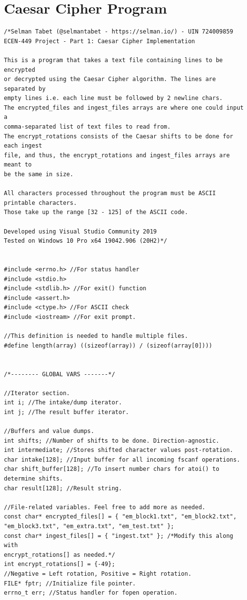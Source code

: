 \documentclass{article}
\begin{document}
\section*{Caesar Cipher Program}
\begin{verbatim}
/*Selman Tabet (@selmantabet - https://selman.io/) - UIN 724009859
ECEN-449 Project - Part 1: Caesar Cipher Implementation

This is a program that takes a text file containing lines to be encrypted
or decrypted using the Caesar Cipher algorithm. The lines are separated by 
empty lines i.e. each line must be followed by 2 newline chars.
The encrypted_files and ingest_files arrays are where one could input a 
comma-separated list of text files to read from.
The encrypt_rotations consists of the Caesar shifts to be done for each ingest
file, and thus, the encrypt_rotations and ingest_files arrays are meant to
be the same in size.

All characters processed throughout the program must be ASCII printable characters.
Those take up the range [32 - 125] of the ASCII code.

Developed using Visual Studio Community 2019
Tested on Windows 10 Pro x64 19042.906 (20H2)*/


#include <errno.h> //For status handler
#include <stdio.h>
#include <stdlib.h> //For exit() function
#include <assert.h>
#include <ctype.h> //For ASCII check
#include <iostream> //For exit prompt.

//This definition is needed to handle multiple files.
#define length(array) ((sizeof(array)) / (sizeof(array[0])))


/*-------- GLOBAL VARS -------*/

//Iterator section.
int i; //The intake/dump iterator.
int j; //The result buffer iterator.

//Buffers and value dumps.
int shifts; //Number of shifts to be done. Direction-agnostic.
int intermediate; //Stores shifted character values post-rotation.
char intake[128]; //Input buffer for all incoming fscanf operations.
char shift_buffer[128]; //To insert number chars for atoi() to determine shifts.
char result[128]; //Result string.

//File-related variables. Feel free to add more as needed.
const char* encrypted_files[] = { "em_block1.txt", "em_block2.txt",
"em_block3.txt", "em_extra.txt", "em_test.txt" };
const char* ingest_files[] = { "ingest.txt" }; /*Modify this along with
encrypt_rotations[] as needed.*/
int encrypt_rotations[] = {-49}; 
//Negative = Left rotation, Positive = Right rotation.
FILE* fptr; //Initialize file pointer.
errno_t err; //Status handler for fopen operation. 


\end{verbatim}
\end{document}
